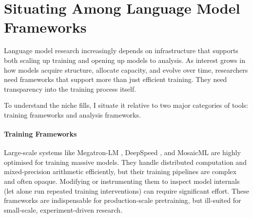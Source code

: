 \section[Situating \picomed Among Language Model Frameworks]{Situating \picolarge Among Language Model Frameworks}
\label{sec:pico-related}

Language model research increasingly depends on infrastructure that supports both scaling up training and opening up models to analysis. As interest grows in how models acquire structure, allocate capacity, and evolve over time, researchers need frameworks that support more than just efficient training. They need transparency into the training process itself.

To understand the niche \pico fills, I situate it relative to two major categories of tools: training frameworks and analysis frameworks.


\paragraph{Training Frameworks}
Large-scale systems like Megatron-LM \citep{narayanan2021megatron}, DeepSpeed \citep{rasley2020deepspeed}, and MosaicML \citep{mosaic2023mpt} are highly optimised for training massive models. They handle distributed computation and mixed-precision arithmetic efficiently, but their training pipelines are complex and often opaque. Modifying or instrumenting them to inspect model internals (let alone run repeated training interventions) can require significant effort. These frameworks are indispensable for production-scale pretraining, but ill-suited for small-scale, experiment-driven research.

